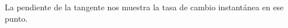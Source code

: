 \documentclass[preview]{standalone}
\begin{document}
\begin{center}
La pendiente de la tangente nos muestra la tasa de cambio instantánea en ese punto.
\end{center}
\end{document}
